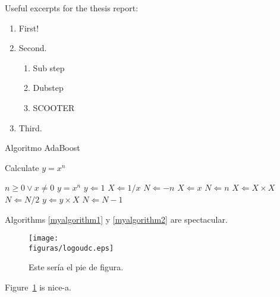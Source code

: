 Useful excerpts for the thesis report:

\begin{algorithm}[H]
 \begin{enumerate}
 \item First!
 \item Second.
    \begin{enumerate}
        \item Sub step
        \item Dubstep
        \item SCOOTER
    \end{enumerate}
 \item Third.
 \end{enumerate}
 \caption{Algoritmo AdaBoost}
 \label{myalgorithm1}
\end{algorithm}

\begin{algorithm}                      %
\caption{Calculate $y = x^n$}          %
\label{myalgorithm2}                           %
\begin{algorithmic}                    %
    \Require $n \geq 0 \vee x \neq 0$
    \Ensure $y = x^n$
    \State $y \Leftarrow 1$
        \State $X \Leftarrow 1 / x$
        \State $N \Leftarrow -n$
    \Else
        \State $X \Leftarrow x$
        \State $N \Leftarrow n$
    \EndIf
            \State $X \Leftarrow X \times X$
            \State $N \Leftarrow N / 2$
        \Else[$N$ is odd]
            \State $y \Leftarrow y \times X$
            \State $N \Leftarrow N - 1$
        \EndIf
    \EndWhile
\end{algorithmic}
\end{algorithm}

Algorithms \ref{myalgorithm1} y \ref{myalgorithm2} are spectacular.

\begin{figure}[H]
    \centerline{\texttt{[image: \\figuras/logoudc.eps]}}
    \label{fig:mifigura}\caption{Este sería el pie de figura.}
\end{figure}

Figure~\ref{fig:mifigura} is nice-a.
